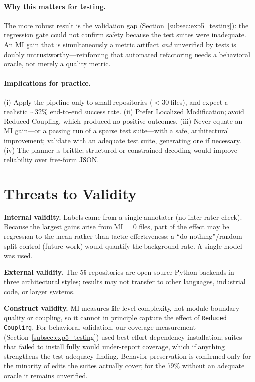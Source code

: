 \documentclass[runningheads]{llncs}
\begin{document}
\paragraph{Why this matters for testing.} The more robust result is the validation gap (Section~\ref{subsec:exp5_testing}): the regression gate could not confirm safety because the test suites were inadequate. An MI gain that is simultaneously a metric artifact \emph{and} unverified by tests is doubly untrustworthy---reinforcing that automated refactoring needs a behavioral oracle, not merely a quality metric.

\paragraph{Implications for practice.} (i) Apply the pipeline only to small repositories ($<$30 files), and expect a realistic $\sim$32\% end-to-end success rate. (ii) Prefer Localized Modification; avoid Reduced Coupling, which produced no positive outcomes. (iii) Never equate an MI gain---or a passing run of a sparse test suite---with a safe, architectural improvement; validate with an adequate test suite, generating one if necessary. (iv) The planner is brittle; structured or constrained decoding would improve reliability over free-form JSON.

\section{Threats to Validity}

\textbf{Internal validity.} Labels came from a single annotator (no inter-rater check). Because the largest gains arise from MI = 0 files, part of the effect may be regression to the mean rather than tactic effectiveness; a ``do-nothing''/random-split control (future work) would quantify the background rate. A single model was used.

\textbf{External validity.} The 56 repositories are open-source Python backends in three architectural styles; results may not transfer to other languages, industrial code, or larger systems.

\textbf{Construct validity.} MI measures file-level complexity, not module-boundary quality or coupling, so it cannot in principle capture the effect of \texttt{Reduced Coupling}. For behavioral validation, our coverage measurement (Section~\ref{subsec:exp5_testing}) used best-effort dependency installation; suites that failed to install fully would under-report coverage, which if anything strengthens the test-adequacy finding. Behavior preservation is confirmed only for the minority of edits the suites actually cover; for the 79\% without an adequate oracle it remains unverified.
\end{document}
